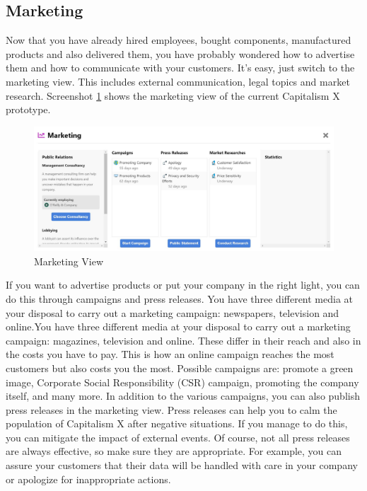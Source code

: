 \subsection{Marketing} \label{marketing_manual}

Now that you have already hired employees, bought components, manufactured products and also delivered them, you have probably wondered how to advertise them and how to communicate with your customers. It's easy, just switch to the marketing view. This includes external communication, legal topics and market research.
Screenshot \ref{fig:marketing_view} shows the marketing view of the current Capitalism X prototype.

\begin{figure}
    \centering
    \includegraphics [width=\textwidth]{images/marketing_view.png}
    \caption{Marketing View}
    \label{fig:marketing_view}
\end{figure}

If you want to advertise products or put your company in the right light, you can do this through campaigns and press releases. You have three different media at your disposal to carry out a marketing campaign: newspapers, television and online.You have three different media at your disposal to carry out a marketing campaign: magazines, television and online. These differ in their reach and also in the costs you have to pay. This is how an online campaign reaches the most customers but also costs you the most. Possible campaigns are: promote a green image, Corporate Social Responsibility (\gls{CSR}) campaign, promoting the company itself, and many more.
In addition to the various campaigns, you can also publish press releases in the marketing view. Press releases can help you to calm the population of Capitalism X after negative situations. If you manage to do this, you can mitigate the impact of external events. Of course, not all press releases are always effective, so make sure they are appropriate. 
For example, you can assure your customers that their data will be handled with care in your company or apologize for inappropriate actions.

